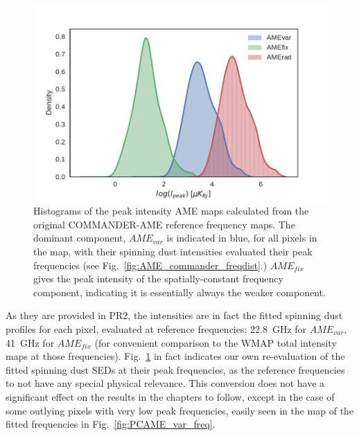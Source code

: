           \begin{figure}
           \includegraphics[width=\textwidth]{../Plots/ch_allsky/AME_comps_distplot.pdf}
           \centering
           \caption{Histograms of the peak intensity AME maps calculated from the original COMMANDER-AME reference frequency maps. The dominant component, $AME_{var}$ is indicated in blue, for all pixels in the map, with their spinning dust intensities evaluated their peak frequencies (see Fig.~\ref{fig:AME_commander_freqdist}.) $AME_{fix}$ gives the peak intensity of the spatially-constant frequency component, indicating it is essentially always the weaker component.}
           \label{fig:AME_comps_distplot}
          \end{figure}
           As they are provided in PR2, the intensities are in fact the fitted spinning dust profiles for each pixel, evaluated at reference frequencies: 22.8~GHz for $AME_{var}$, 41~GHz for $AME_{fix}$ (for convenient comparison to the WMAP total intensity maps at those frequencies). Fig.~\ref{fig:AME_comps_distplot} in fact indicates our own re-evaluation of the fitted spinning dust SEDs at their peak frequencies, as the reference frequencies to not have any special physical relevance. This conversion does not have a significant effect on the results in the chapters to follow, except in the case of some outlying pixels with very low peak frequencies, easily seen in the map of the fitted frequencies in Fig.~\ref{fig:PCAME_var_freq}.
